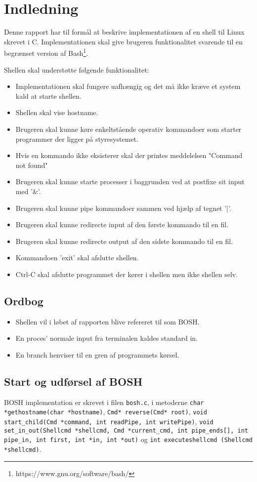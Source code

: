 \section{Indledning}
Denne rapport har til formål at beskrive implementationen af en shell til Linux skrevet i C. Implementationen skal give brugeren funktionalitet svarende til en begrænset version af Bash\footnote{https://www.gnu.org/software/bash/}. 

Shellen skal understøtte følgende funktionalitet:
\begin{itemize}
	\item Implementationen skal fungere uafhængig og det må ikke kræve et system kald at starte shellen.
	\item Shellen skal vise hostname.
	\item Brugeren skal kunne køre enkeltstående operativ kommandoer som starter programmer der ligger på styresystemet.
	\item Hvis en kommando ikke eksisterer skal der printes meddelelsen "Command not found"
	\item Brugeren skal kunne starte processer i baggrunden ved at postfixe sit input med '\&'.
	\item Brugeren skal kunne pipe kommandoer sammen ved hjælp af tegnet '|'.
	\item Brugeren skal kunne redirecte input af den første kommando til en fil.
	\item Brugeren skal kunne redirecte output af den sidste kommando til en fil.
	\item Kommandoen 'exit' skal afslutte shellen.
	\item Ctrl-C skal afslutte programmet der kører i shellen men ikke shellen selv.
\end{itemize}

\subsection{Ordbog}
\begin{itemize}
	\item Shellen vil i løbet af rapporten blive refereret til som BOSH.
	\item En proces' normale input fra terminalen kaldes standard in.
	\item En branch henviser til en gren af programmets kørsel.
\end{itemize}


\subsection{Start og udførsel af BOSH}
BOSH implementation er skrevet i filen \verb+bosh.c+, i metoderne \verb+char *gethostname(char *hostname)+, \verb+Cmd* reverse(Cmd* root)+, \verb+void start_child(Cmd *command, int readPipe, int writePipe)+, \verb+void set_in_out(Shellcmd *shellcmd, Cmd *current_cmd, int pipe_ends[], int pipe_in, int first, int *in, int *out)+ og \verb+int executeshellcmd (Shellcmd *shellcmd)+. 

